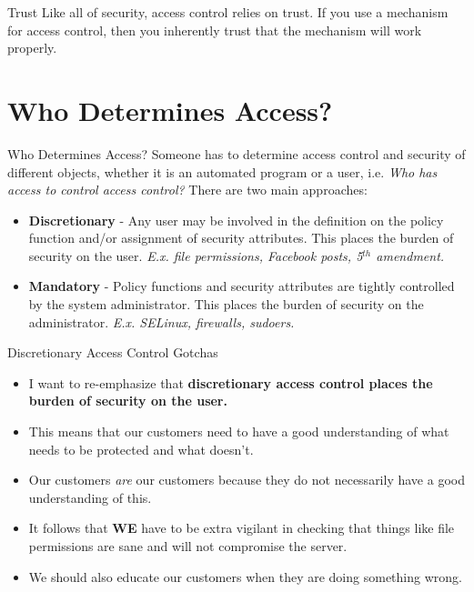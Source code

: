 \documentclass{beamer}
\begin{document}
\begin{frame}{Trust}
Like all of security, access control relies on trust. If you use a mechanism for access control, then you inherently trust that the mechanism will work properly.
\end{frame}

\section{Who Determines Access?}

\begin{frame}{Who Determines Access?}
Someone has to determine access control and security of different objects, whether it is an automated program or a user, i.e. \textit{Who has access to control access control?}
\break \break
There are two main approaches:
\begin{itemize}
  \item \textbf{Discretionary} - Any user may be involved in the definition on the policy function and/or assignment of security attributes. This places the burden of security on the user. \textit{E.x. file permissions, Facebook posts, 5$^{th}$ amendment.}
  \item \textbf{Mandatory} - Policy functions and security attributes are tightly controlled by the system administrator. This places the burden of security on the administrator. \textit{E.x. SELinux, firewalls, sudoers.}
\end{itemize}
\end{frame}

\begin{frame}{Discretionary Access Control Gotchas}
\begin{itemize}
\item I want to re-emphasize that \textbf{discretionary access control places the burden of security on the user.} 
\item This means that our customers need to have a good understanding of what needs to be protected and what doesn't.
\item Our customers \textit{are} our customers because they do not necessarily have a good understanding of this.
\item It follows that \textbf{WE} have to be extra vigilant in checking that things like file permissions are sane and will not compromise the server.
\item We should also educate our customers when they are doing something wrong.
\end{itemize}
\end{frame}
\end{document}
